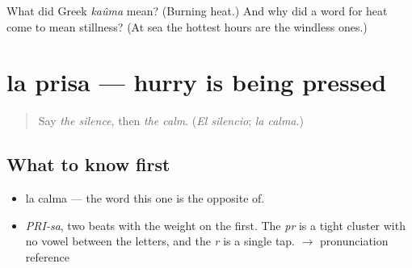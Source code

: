 \begin{tcolorbox}[breakable,colback=teal!4,colframe=teal!35!black,title={Before you move on}]
What did Greek \emph{kaûma} mean? (Burning heat.) And why did a word for heat come to mean stillness? (At sea the hottest hours are the windless ones.)
\end{tcolorbox}
\section[la prisa]{la prisa — hurry is being pressed}

\label{lesson:ES-C333-prisa}



\begin{quote}
Say \emph{the silence}, then \emph{the calm}. (\emph{El silencio}; \emph{la calma}.)
\end{quote}

\subsection*{What to know first}
\begin{itemize}
\raggedright
  \item la calma — the word this one is the opposite of.
\end{itemize}

\begin{sounds}
\begin{itemize}
\raggedright
  \item \emph{PRI-sa}, two beats with the weight on the first. The \emph{pr} is a tight cluster with no vowel between the letters, and the \emph{r} is a single tap. $\to$ pronunciation reference
\end{itemize}
\end{sounds}

